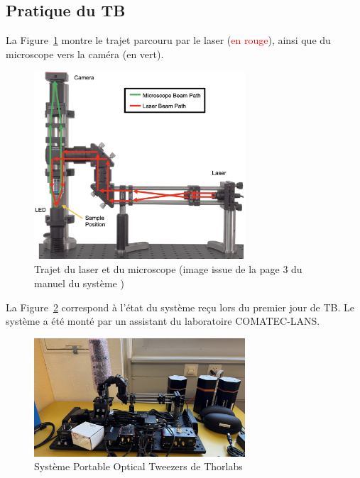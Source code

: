 \subsection{Pratique du TB}
La Figure~\ref{chemin_laser_caméra} montre le trajet parcouru par le laser (\textcolor{red}{en rouge}), ainsi que du microscope vers la caméra (\textcolor[RGB]{0, 120, 0}{en vert}).
\begin{figure}[H]
    \begin{center}
        \includegraphics[width=0.7\textwidth]{assets/figures/Introduction/chemin_laser_camera.jpeg}
    \end{center}
    \caption{Trajet du laser et du microscope (image issue de la page 3 du manuel du système \cite{manualPortableOpticalTweezers})}
    \label{chemin_laser_caméra}
\end{figure}

La Figure~\ref{kit_vierge} correspond à l'état du système reçu lors du premier jour de TB. Le système a été monté par un assistant du laboratoire COMATEC-LANS.

\begin{figure}[H]
    \begin{center}
        \includegraphics[width=0.7\textwidth]{assets/figures/Introduction/kit_vierge.jpeg}
    \end{center}
    \caption{Système Portable Optical Tweezers de Thorlabs}
    \label{kit_vierge}
\end{figure}

